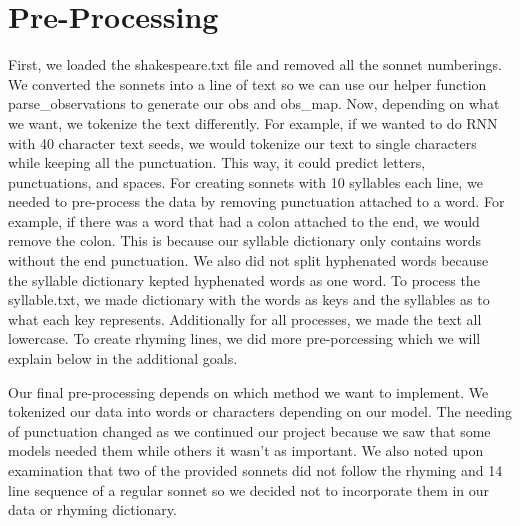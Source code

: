 \section{Pre-Processing}
\medskip
First, we loaded the shakespeare.txt file and removed all the sonnet numberings. We converted the sonnets into a line of text so we can use our helper function parse_observations to generate our obs and obs_map. Now, depending on what we want, we tokenize the text differently. For example, if we wanted to do RNN with 40 character text seeds, we would tokenize our text to single characters while keeping all the punctuation. This way, it could predict letters, punctuations, and spaces. For creating sonnets with 10 syllables each line, we needed to pre-process the data by removing punctuation attached to a word. For example, if there was a word that had a colon attached to the end, we would remove the colon. This is because our syllable dictionary only contains words without the end punctuation. We also did not split hyphenated words because the syllable dictionary kepted hyphenated words as one word. To process the syllable.txt, we made dictionary with the words as keys and the syllables as to what each key represents. Additionally for all processes, we made the text all lowercase. To create rhyming lines, we did more pre-porcessing which we will explain below in the additional goals. 

Our final pre-processing depends on which method we want to implement. We tokenized our data into words or characters depending on our model. The needing of punctuation changed as we continued our project because we saw that some models needed them while others it wasn't as important. We also noted upon examination that two of the provided sonnets did not follow  the rhyming and 14 line sequence of a regular sonnet so we decided not to incorporate them in our data or rhyming dictionary. 
\newpage

